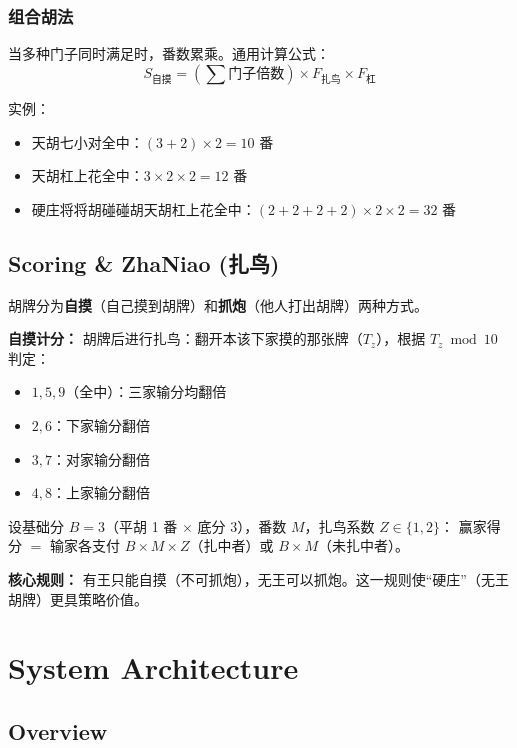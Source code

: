 \documentclass[11pt,a4paper]{article}
\begin{document}
\subsubsection*{组合胡法}
当多种门子同时满足时，番数累乘。通用计算公式：
\begin{equation}
  S_{\text{自摸}} = \left(\sum \text{门子倍数}\right) \times F_{\text{扎鸟}} \times F_{\text{杠}}
\end{equation}

实例：
\begin{itemize}[nosep]
  \item 天胡七小对全中：$(3+2) \times 2 = 10$ 番
  \item 天胡杠上花全中：$3 \times 2 \times 2 = 12$ 番
  \item 硬庄将将胡碰碰胡天胡杠上花全中：$(2+2+2+2) \times 2 \times 2 = 32$ 番
\end{itemize}

\subsection{Scoring \& ZhaNiao (扎鸟)}

胡牌分为\textbf{自摸}（自己摸到胡牌）和\textbf{抓炮}（他人打出胡牌）两种方式。

\textbf{自摸计分：} 胡牌后进行扎鸟：翻开本该下家摸的那张牌（$T_z$），根据 $T_z \bmod 10$ 判定：
\begin{itemize}[nosep]
  \item $1,5,9$（全中）：三家输分均翻倍
  \item $2,6$：下家输分翻倍
  \item $3,7$：对家输分翻倍
  \item $4,8$：上家输分翻倍
\end{itemize}

设基础分 $B = 3$（平胡 1 番 $\times$ 底分 3），番数 $M$，扎鸟系数 $Z \in \{1,2\}$：
赢家得分 $=$ 输家各支付 $B \times M \times Z$（扎中者）或 $B \times M$（未扎中者）。

\textbf{核心规则：} 有王只能自摸（不可抓炮），无王可以抓炮。这一规则使``硬庄''（无王胡牌）更具策略价值。

\section{System Architecture}

\subsection{Overview}
\end{document}
